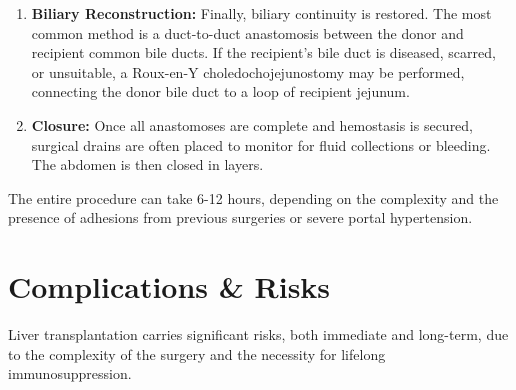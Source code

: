 \begin{enumerate}
\begin{itemize}
    \end{itemize}
    Once vascular anastomoses are complete, the clamps are released, allowing blood flow to the new liver (reperfusion). This can lead to "reperfusion syndrome," characterized by transient hypotension and arrhythmias, requiring careful management.
  \item \textbf{Biliary Reconstruction:} Finally, biliary continuity is restored. The most common method is a duct-to-duct anastomosis between the donor and recipient common bile ducts. If the recipient's bile duct is diseased, scarred, or unsuitable, a Roux-en-Y choledochojejunostomy may be performed, connecting the donor bile duct to a loop of recipient jejunum.
  \item \textbf{Closure:} Once all anastomoses are complete and hemostasis is secured, surgical drains are often placed to monitor for fluid collections or bleeding. The abdomen is then closed in layers.
\end{enumerate}
The entire procedure can take 6-12 hours, depending on the complexity and the presence of adhesions from previous surgeries or severe portal hypertension.

\section*{Complications \& Risks}
Liver transplantation carries significant risks, both immediate and long-term, due to the complexity of the surgery and the necessity for lifelong immunosuppression.

